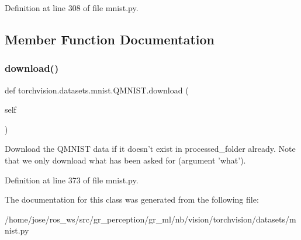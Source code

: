 Definition at line 308 of file mnist.\+py.



\subsection{Member Function Documentation}
\mbox{\label{classtorchvision_1_1datasets_1_1mnist_1_1QMNIST_a1ffa23798789dbdb9d38f411d8419651}} 
\subsubsection{\texorpdfstring{download()}{download()}}
{\footnotesize\ttfamily def torchvision.\+datasets.\+mnist.\+Q\+M\+N\+I\+S\+T.\+download (\begin{DoxyParamCaption}\item[{}]{self }\end{DoxyParamCaption})}

\begin{DoxyVerb}Download the QMNIST data if it doesn't exist in processed_folder already.
   Note that we only download what has been asked for (argument 'what').
\end{DoxyVerb}
 

Definition at line 373 of file mnist.\+py.



The documentation for this class was generated from the following file\+:\begin{DoxyCompactItemize}
\item 
/home/jose/ros\+\_\+ws/src/gr\+\_\+perception/gr\+\_\+ml/nb/vision/torchvision/datasets/mnist.\+py\end{DoxyCompactItemize}
